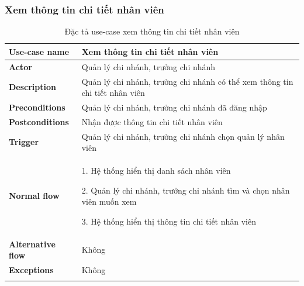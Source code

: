 \subsubsection{Xem thông tin chi tiết nhân viên}
{
    \setlength\extrarowheight{6pt}
    \begin{longtable}{| p{} | p{} |}
        \hline
        \textbf{Use-case name}
         &
        Xem thông tin chi tiết nhân viên
        \\
        \hline
        \textbf{Actor}
         &
        Quản lý chi nhánh, trưởng chi nhánh
        \\
        \hline
        \textbf{Description}
         &
        Quản lý chi nhánh, trưởng chi nhánh có thể xem thông tin chi tiết nhân viên
        \\
        \hline
        \textbf{Preconditions}
         &
        Quản lý chi nhánh, trưởng chi nhánh đã đăng nhập
        \\
        \hline
        \textbf{Postconditions}
         &
        Nhận được thông tin chi tiết nhân viên
        \\
        \hline
        \textbf{Trigger}
         &
        Quản lý chi nhánh, trưởng chi nhánh chọn quản lý nhân viên
        \\
        \hline
        \begin{flushleft}
            \textbf{Normal flow}
        \end{flushleft}
         &
        1. Hệ thống hiển thị danh sách nhân viên

        2. Quản lý chi nhánh, trưởng chi nhánh tìm và chọn nhân viên muốn xem

        3. Hệ thống hiển thị thông tin chi tiết nhân viên
        \\
        \hline
        \textbf{Alternative flow}
         &
        Không
        \\
        \hline
        \textbf{Exceptions}
         &
        Không
        \\
        \hline
        \caption{Đặc tả use-case xem thông tin chi tiết nhân viên}
    \end{longtable}
}


